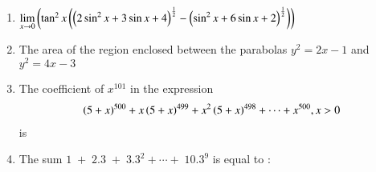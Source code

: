 \documentclass[journal,,12pt,onecolumn]{IEEEtran}
\theoremstyle{remark}
\begin{document}
\begin{enumerate}
 \item $\lim \limits_{x\to 0}\left(\tan^2{x}\left(\left(2\sin^2{x}+3\sin{x}+4\right)^{\frac{1}{2}}-\left(\sin^2{x}+6\sin{x}+2\right)^{\frac{1}{2}}\right)\right)$
 \begin{enumerate}
 \end{enumerate}
 \bigskip
 \item The area of the region enclosed between the parabolas $y^2=2x-1$ and $y^2=4x-3$
 \begin{enumerate}
 \end{enumerate}
\bigskip
 \item The coefficient of $x^{101}$ in the expression 
 \begin{align*}
     \left(5+x\right)^{500}+x\left(5+x\right)^{499}+x^2\left(5+x\right)^{498}+ \cdots + x^{500}, x>0
 \end{align*}
 is
 \begin{enumerate}
 \end{enumerate}
 \bigskip
 \item The sum $1\;+\;2.3\;+\;3.3^{2}+ \cdots +\;10.3^{9}$ is equal to :
 \begin{enumerate}
\end{enumerate}
\end{enumerate}
\end{document}
